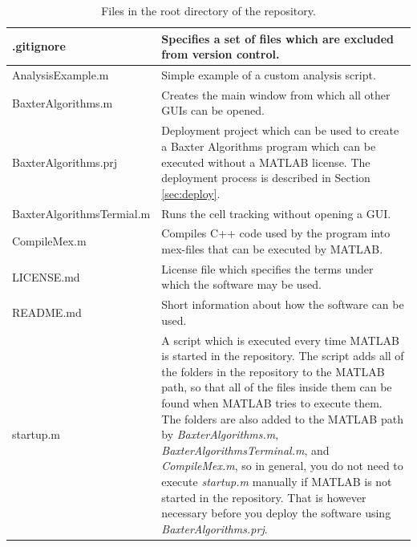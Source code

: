 \documentclass[a4paper, oneside, onecolumn, 11pt]{article}
\newcommand{\file}[1]{\emph{#1}}
\begin{document}
\begin{table}[!htbp]
\caption{Files in the root directory of the repository.}
\label{tab:files}
\begin{tabularx}{\textwidth}{lX}
\hline
.gitignore & Specifies a set of files which are excluded from version control.\\[5pt] \hline

AnalysisExample.m & Simple example of a custom analysis script.\\[5pt] \hline

BaxterAlgorithms.m & Creates the main window from which all other GUIs can be opened.\\[5pt] \hline

BaxterAlgorithms.prj & Deployment project which can be used to create a Baxter Algorithms program which can be executed without a MATLAB license. The deployment process is described in Section \ref{sec:deploy}.\\[5pt] \hline

BaxterAlgorithmsTermial.m &  Runs the cell tracking without opening a GUI.\\[5pt] \hline

CompileMex.m &  Compiles C++ code used by the program into mex-files that can be executed by MATLAB.\\[5pt] \hline

LICENSE.md & License file which specifies the terms under which the software may be used.\\[5pt] \hline

README.md & Short information about how the software can be used.\\[5pt] \hline

startup.m &  A script which is executed every time MATLAB is started in the repository. The script adds all of the folders in the repository to the MATLAB path, so that all of the files inside them can be found when MATLAB tries to execute them. The folders are also added to the MATLAB	path by \file{BaxterAlgorithms.m}, \file{BaxterAlgorithmsTerminal.m}, and \file{CompileMex.m}, so in general, you do not need to execute \file{startup.m} manually if MATLAB is not started in the repository. That is however necessary before you deploy the software using \file{BaxterAlgorithms.prj}.\\[5pt] \hline
\end{tabularx}
\end{table}
\end{document}
